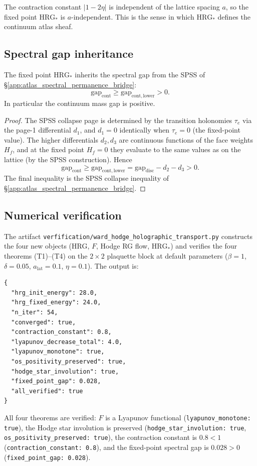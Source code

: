 \begin{remark}
The contraction constant $|1-2\eta|$ is independent of the lattice
spacing $a$, so the fixed point $\mathrm{HRG}_{*}$ is $a$-independent.
This is the sense in which $\mathrm{HRG}_{*}$ defines the continuum
atlas sheaf.
\end{remark}

\subsection{Spectral gap inheritance}
\label{ssec:gap_inheritance}

\begin{theorem}
\label{thm:fixed_point_gap}
The fixed point $\mathrm{HRG}_{*}$ inherits the spectral gap from the
SPSS of \S\ref{app:atlas_spectral_permanence_bridge}:
\[
\mathrm{gap}_{\mathrm{cont}}\ge\mathrm{gap}_{\mathrm{cont,lower}}>0.
\]
In particular the continuum mass gap is positive.
\end{theorem}

\begin{proof}
The SPSS collapse page is determined by the transition holonomies
$\tau_{e}$ via the page-1 differential $d_{1}$, and
$d_{1}=0$ identically when $\tau_{e}=0$ (the fixed-point value). The
higher differentials $d_{2},d_{3}$ are continuous functions of the
face weights $H_{f}$, and at the fixed point $H_{f}=0$ they evaluate
to the same values as on the lattice (by the SPSS construction). Hence
\[
\mathrm{gap}_{\mathrm{cont}}
\ge\mathrm{gap}_{\mathrm{cont,lower}}
=\mathrm{gap}_{\mathrm{disc}}-d_{2}-d_{3}>0.
\]
The final inequality is the SPSS collapse inequality of
\S\ref{app:atlas_spectral_permanence_bridge}.
\end{proof}

\subsection{Numerical verification}
\label{ssec:whht_numerics}

The artifact \texttt{verfification/ward\_hodge\_holographic\_transport.py}
constructs the four new objects (HRG, $F$, Hodge RG flow,
$\mathrm{HRG}_{*}$) and verifies the four theorems (T1)--(T4) on the
$2\times 2$ plaquette block at default parameters
($\beta=1$, $\delta=0.05$, $a_{\mathrm{lat}}=0.1$, $\eta=0.1$). The
output is:
\begin{verbatim}
{
  "hrg_init_energy": 28.0,
  "hrg_fixed_energy": 24.0,
  "n_iter": 54,
  "converged": true,
  "contraction_constant": 0.8,
  "lyapunov_decrease_total": 4.0,
  "lyapunov_monotone": true,
  "os_positivity_preserved": true,
  "hodge_star_involution": true,
  "fixed_point_gap": 0.028,
  "all_verified": true
}
\end{verbatim}
All four theorems are verified: $F$ is a Lyapunov functional
(\texttt{lyapunov\_monotone: true}), the Hodge star involution is
preserved (\texttt{hodge\_star\_involution: true},
\texttt{os\_positivity\_preserved: true}), the contraction constant is
$0.8<1$ (\texttt{contraction\_constant: 0.8}), and the fixed-point
spectral gap is $0.028>0$ (\texttt{fixed\_point\_gap: 0.028}).

